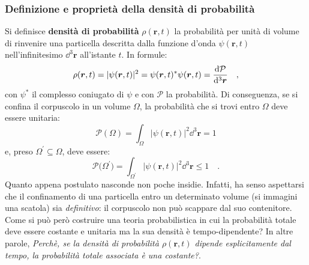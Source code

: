 \subsubsection{Definizione e proprietà della densità di probabilità}
Si definisce \textbf{densità di probabilità} $\rho(\bm{r},t)$ la probabilità per unità di volume di rinvenire una particella descritta dalla funzione d'onda $\psi(\bm{r},t)$ nell'infinitesimo $\dd^3{\bm{r}}$ all'istante $t$. In formule:
\begin{equation}
    \rho(\bm{r}, t) = |\psi(\bm{r}, t)|^2 = \psi(\bm{r}, t)^*\psi(\bm{r}, t) = \dv{\mathcal{P}}{^3\bm{r}} \quad,
    \label{eq:prob_dens}
\end{equation}
con $\psi^*$ il complesso coniugato di $\psi$ e con $\mathcal{P}$ la probabilità. Di conseguenza, se si confina il corpuscolo in un volume $\Omega$, la probabilità che si trovi entro $\Omega$ deve essere unitaria:
\begin{equation}
        \mathcal{P}(\Omega) = \int_\Omega |\psi(\bm{r}, t)|^2 \dd^3{\bm{r}} = 1
        \label{eq:unit_psi}
\end{equation}
e, preso $\Omega^{'} \subseteq \Omega$, deve essere:
\[
    \mathcal{P}\big(\Omega^{'}\big) = \int_{\Omega^{'}} |\psi(\bm{r}, t)|^2 \dd^3{\bm{r}} \leq 1 \quad.
\]
Quanto appena postulato nasconde non poche insidie. Infatti, ha senso aspettarsi che il confinamento di una particella entro un determinato volume (si immagini una scatola) sia \emph{definitivo}: il corpuscolo non può scappare dal suo contenitore. Come si può però costruire una teoria probabilistica in cui la probabilità totale deve essere costante e unitaria ma la sua densità è tempo-dipendente? In altre parole, \guillemetleft\emph{Perchè, se la densità di probabilità $\rho(\bm{r},t)$ dipende esplicitamente dal tempo, la probabilità totale associata è una costante?}\guillemetright.

